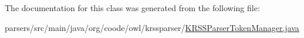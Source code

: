 The documentation for this class was generated from the following file\-:\begin{DoxyCompactItemize}
\item 
parsers/src/main/java/org/coode/owl/krssparser/\hyperlink{_k_r_s_s_parser_token_manager_8java}{K\-R\-S\-S\-Parser\-Token\-Manager.\-java}\end{DoxyCompactItemize}
